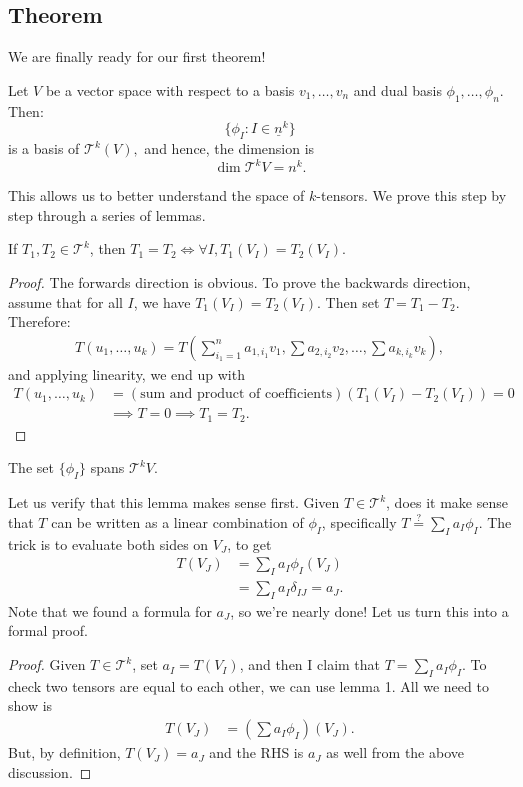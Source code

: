 \documentclass{article}
\numberwithin{equation}{section}
\begin{document}
\subsection{Theorem}
We are finally ready for our first theorem!
\begin{theorem}
    Let $V$ be a vector space with respect to a basis $v_1,\dots,v_n$ and dual basis $\phi_1,\dots,\phi_n$. Then:
    \begin{equation}
        \{\phi_I:I\in \underline{n}^k\}
    \end{equation}
    is a basis of $\mathcal{T}^k(V),$ and hence, the dimension is
    \begin{equation}
        \dim \mathcal{T}^kV = n^k.
    \end{equation}
\end{theorem}
This allows us to better understand the space of $k$-tensors. We prove this step by step through a series of lemmas.
\begin{lemma}
    If $T_1,T_2\in\mathcal{T}^k$, then $T_1=T_2 \iff \forall I, T_1(V_I)=T_2(V_I)$.
\end{lemma}
\begin{proof}
    The forwards direction is obvious. To prove the backwards direction, assume that for all $I$, we have $T_1(V_I)=T_2(V_I)$. Then set $T=T_1-T_2$. Therefore:
    \begin{align*}
        T(u_1,\dots,u_k) = T\left(\sum_{{i_1}=1}^n a_{1,i_1}v_1,\sum a_{2,i_2}v_2,\dots,\sum a_{k,i_k}v_k\right),
    \end{align*}
    and applying linearity, we end up with
    \begin{align*}
        T(u_1,\dots,u_k) &= (\text{sum and product of coefficients})(T_1(V_I)-T_2(V_I)) = 0 \\ 
        &\implies T = 0 \implies T_1=T_2.
    \end{align*}
\end{proof}
\begin{lemma}
    The set $\{\phi_I\}$ spans $\mathcal{T}^kV.$
\end{lemma}
Let us verify that this lemma makes sense first. Given $T\in \mathcal{T}^k$, does it make sense that $T$ can be written as a linear combination of $\phi_I$, specifically $T\stackrel{?}{=} \sum_I a_I\phi_I.$ The trick is to evaluate both sides on $V_J$, to get
\begin{align*}
    T(V_J) &= \sum_I a_I\phi_I(V_J) \\ 
    &= \sum_{I} a_I\delta_{IJ} = a_J.
\end{align*}
Note that we found a formula for $a_J$, so we're nearly done! Let us turn this into a formal proof.
\begin{proof}
    Given $T\in \mathcal{T}^k$, set $a_I =  T(V_I)$, and then I claim that $T = \sum_I a_I\phi_I$. To check two tensors are equal to each other, we can use lemma 1. All we need to show is
    \begin{align*}
        T(V_J) &= \left(\sum a_I\phi_I\right)(V_J).
    \end{align*}
    But, by definition, $T(V_J)=a_J$ and the RHS is $a_J$ as well from the above discussion.
\end{proof}
\end{document}
